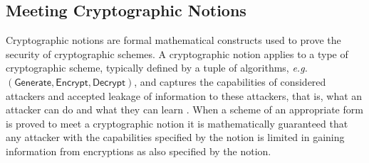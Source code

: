 \subsection{Meeting Cryptographic Notions}\label{subsec:prelims:crypto_notions}
Cryptographic notions are formal mathematical constructs used to prove the security of cryptographic schemes. A cryptographic notion applies to a type of cryptographic scheme, typically defined by a tuple of algorithms, \textit{e.g.} $(\mathsf{Generate},\mathsf{Encrypt},\mathsf{Decrypt})$, and captures the capabilities of considered attackers and accepted leakage of information to these attackers, that is, what an attacker can do and what they can learn \cite{katzIntroductionModernCryptography2008}. When a scheme of an appropriate form is proved to meet a cryptographic notion it is mathematically guaranteed that any attacker with the capabilities specified by the notion is limited in gaining information from encryptions as also specified by the notion.

